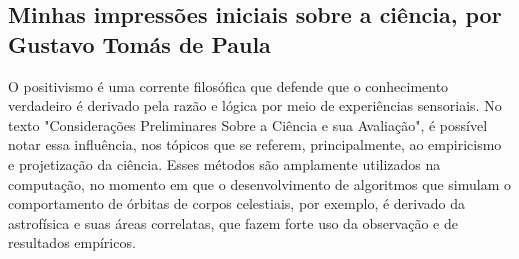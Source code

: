 \subsection{Minhas impressões iniciais sobre a ciência, por Gustavo Tomás de Paula}

O positivismo \citet{wikipedia_positivismo_2022} é uma corrente filosófica que defende que o conhecimento verdadeiro é derivado pela razão e lógica por meio de experiências sensoriais. No texto "Considerações Preliminares Sobre a Ciência e sua Avaliação", é possível notar essa influência, nos tópicos que se referem, principalmente, ao empiricismo e projetização da ciência. Esses métodos são amplamente utilizados na computação, no momento em que o desenvolvimento de algoritmos que simulam o comportamento de órbitas de corpos celestiais, por exemplo, é derivado da astrofísica e suas áreas correlatas, que fazem forte uso da observação e de resultados empíricos.
